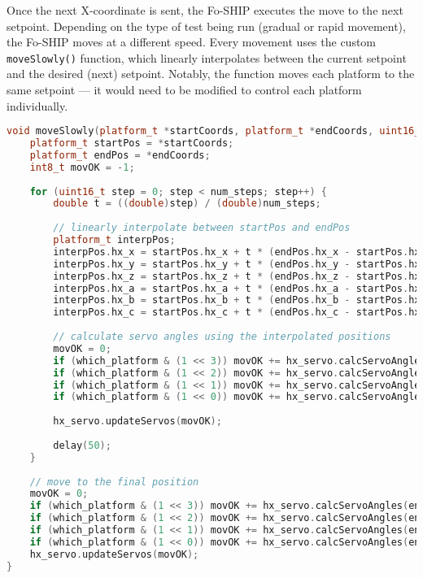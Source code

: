 \documentclass[11pt]{ucthesisCP}
\begin{document}
Once the next X-coordinate is sent, the Fo-SHIP executes the move to the next setpoint. Depending on the type of test being run (gradual or rapid movement), the Fo-SHIP moves at a different speed. Every movement uses the custom \verb|moveSlowly()| function, which linearly interpolates between the current setpoint and the desired (next) setpoint. Notably, the function moves each platform to the same setpoint --- it would need to be modified to control each platform individually.

\begin{lstlisting}[language=C++]
void moveSlowly(platform_t *startCoords, platform_t *endCoords, uint16_t num_steps, uint8_t which_platform) {
	platform_t startPos = *startCoords;
	platform_t endPos = *endCoords;
	int8_t movOK = -1;
	
	for (uint16_t step = 0; step < num_steps; step++) {
		double t = ((double)step) / (double)num_steps;
		
		// linearly interpolate between startPos and endPos
		platform_t interpPos;
		interpPos.hx_x = startPos.hx_x + t * (endPos.hx_x - startPos.hx_x);
		interpPos.hx_y = startPos.hx_y + t * (endPos.hx_y - startPos.hx_y);
		interpPos.hx_z = startPos.hx_z + t * (endPos.hx_z - startPos.hx_z);
		interpPos.hx_a = startPos.hx_a + t * (endPos.hx_a - startPos.hx_a);
		interpPos.hx_b = startPos.hx_b + t * (endPos.hx_b - startPos.hx_b);
		interpPos.hx_c = startPos.hx_c + t * (endPos.hx_c - startPos.hx_c);
		
		// calculate servo angles using the interpolated positions
		movOK = 0;
		if (which_platform & (1 << 3)) movOK += hx_servo.calcServoAngles(interpPos, servo_angles0, 0);
		if (which_platform & (1 << 2)) movOK += hx_servo.calcServoAngles(interpPos, servo_angles1, 1);
		if (which_platform & (1 << 1)) movOK += hx_servo.calcServoAngles(interpPos, servo_angles2, 2);
		if (which_platform & (1 << 0)) movOK += hx_servo.calcServoAngles(interpPos, servo_angles3, 3);
		
		hx_servo.updateServos(movOK);
		
		delay(50);
	}
	
	// move to the final position
	movOK = 0;
	if (which_platform & (1 << 3)) movOK += hx_servo.calcServoAngles(endPos, servo_angles0, 0);
	if (which_platform & (1 << 2)) movOK += hx_servo.calcServoAngles(endPos, servo_angles1, 1);
	if (which_platform & (1 << 1)) movOK += hx_servo.calcServoAngles(endPos, servo_angles2, 2);
	if (which_platform & (1 << 0)) movOK += hx_servo.calcServoAngles(endPos, servo_angles3, 3);
	hx_servo.updateServos(movOK);
}
\end{lstlisting}
\end{document}
